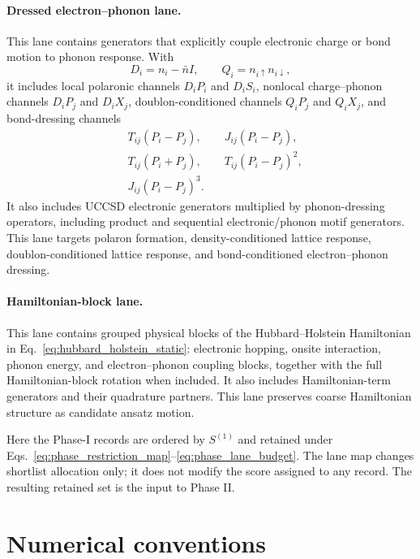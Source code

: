 \documentclass[
  reprint,
  amsmath,
  amssymb,
  aps,
  pra,
  nofootinbib,
  superscriptaddress,
  floatfix
]{revtex4-2}
\begin{document}
\paragraph*{Dressed electron--phonon lane.}
This lane contains generators that explicitly couple electronic charge or bond
motion to phonon response. With
\[
D_i=n_i-\bar n I,
\qquad
Q_i=n_{i\uparrow}n_{i\downarrow},
\]
it includes local polaronic channels \(D_iP_i\) and \(D_iS_i\), nonlocal
charge--phonon channels \(D_iP_j\) and \(D_iX_j\), doublon-conditioned channels
\(Q_iP_j\) and \(Q_iX_j\), and bond-dressing channels
\begin{align*}
&T_{ij}(P_i-P_j),
\qquad
J_{ij}(P_i-P_j),\\
&T_{ij}(P_i+P_j),
\qquad
T_{ij}(P_i-P_j)^2,\\
&J_{ij}(P_i-P_j)^3 .
\end{align*}
It also includes UCCSD electronic generators multiplied by phonon-dressing
operators, including product and sequential electronic/phonon motif generators.
This lane targets polaron formation, density-conditioned lattice response,
doublon-conditioned lattice response, and bond-conditioned electron--phonon
dressing.

\paragraph*{Hamiltonian-block lane.}
This lane contains grouped physical blocks of the Hubbard--Holstein Hamiltonian
in Eq.~\eqref{eq:hubbard_holstein_static}: electronic hopping, onsite
interaction, phonon energy, and electron--phonon coupling blocks, together with
the full Hamiltonian-block rotation when included. It also includes
Hamiltonian-term generators and their quadrature partners. This lane preserves
coarse Hamiltonian structure as candidate ansatz motion.

Here the Phase-I records are ordered by \(S^{(1)}\) and retained under
Eqs.~\eqref{eq:phase_restriction_map}--\eqref{eq:phase_lane_budget}. The lane
map changes shortlist allocation only; it does not modify the score assigned to
any record. The resulting retained set is the input to Phase II.


\section{Numerical conventions}
\label{app:numerical_conventions}
\end{document}
